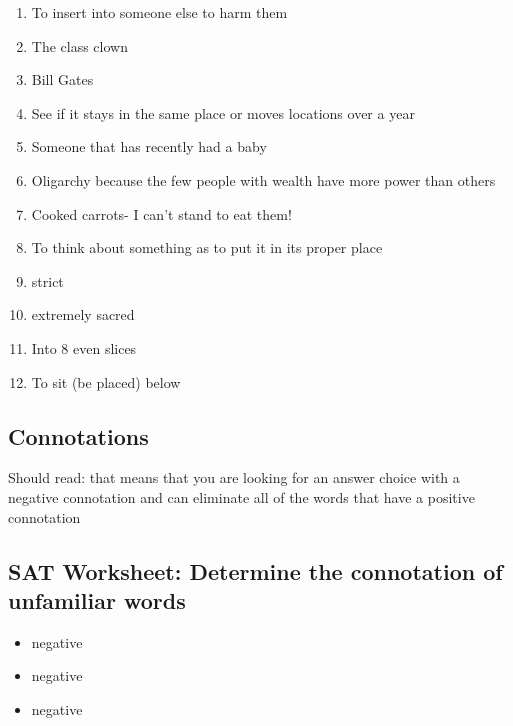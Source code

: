 \begin{enumerate}
\begin{enumerate}
\item To insert into someone else to harm them

\item The class clown

\item Bill Gates

\item See if it stays in the same place or moves locations over a year

\item Someone that has recently had a baby

\item Oligarchy because the few people with wealth have more power than others

\item Cooked carrots- I can't stand to eat them!

\item To think about something as to put it in its proper place

\item strict

\item extremely sacred

\item Into 8 even slices

\item To sit (be placed) below

\end{enumerate}

\subsection{Connotations}

Should read: that means that you are looking for an answer choice with a negative connotation and can eliminate all of the words that have a positive connotation

\subsection{SAT Worksheet: Determine the connotation of unfamiliar words}

\begin{itemize}

\item negative

\item negative

\item negative


\end{itemize}
\end{enumerate}
